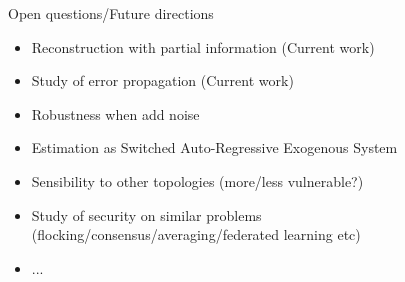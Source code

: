 \documentclass[aspectratio=169]{beamer}
\begin{document}
\begin{frame}{Open questions/Future directions}
    \begin{itemize}[<+->]
      \item Reconstruction with partial information (Current work)
      \item Study of error propagation (Current work)
      \item Robustness when add noise
      \item Estimation as Switched Auto-Regressive Exogenous System
      \item Sensibility to other topologies (more/less vulnerable?)
      \item Study of security on similar problems (flocking/consensus/averaging/federated learning etc)
      \item ...
    \end{itemize}
\end{frame}


\end{document}
